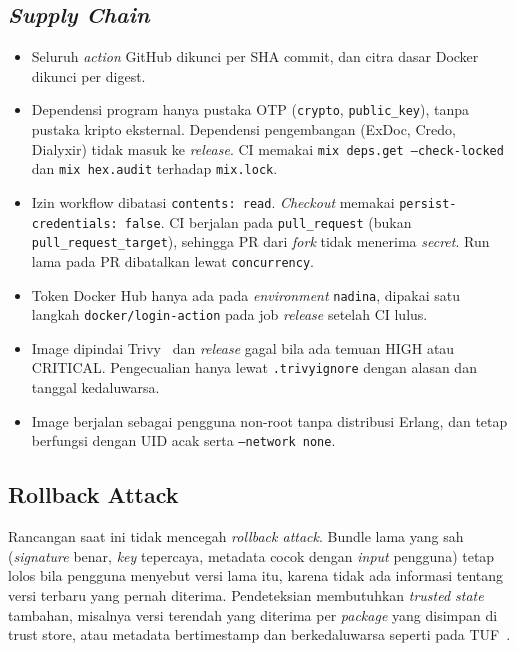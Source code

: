 \subsection{\textit{Supply Chain}}

\begin{itemize}
  \item Seluruh \textit{action} GitHub dikunci per SHA commit, dan citra dasar Docker dikunci per
        digest.
  \item Dependensi program hanya pustaka OTP (\texttt{crypto}, \texttt{public\_key}),
        tanpa pustaka kripto eksternal. Dependensi pengembangan (ExDoc, Credo, Dialyxir)
        tidak masuk ke \textit{release}. CI memakai \texttt{mix deps.get --check-locked}
        dan \texttt{mix hex.audit} terhadap \texttt{mix.lock}.
  \item Izin workflow dibatasi \texttt{contents: read}. \textit{Checkout} memakai
        \texttt{persist-credentials: false}. CI berjalan pada \texttt{pull\_request}
        (bukan \texttt{pull\_request\_target}), sehingga PR dari \textit{fork} tidak
        menerima \textit{secret}. Run lama pada PR dibatalkan lewat \texttt{concurrency}.
  \item Token Docker Hub hanya ada pada \textit{environment} \texttt{nadina}, dipakai satu
        langkah \texttt{docker/login-action} pada job \textit{release} setelah CI lulus.
  \item Image dipindai Trivy~\cite{trivy} dan \textit{release} gagal bila ada temuan HIGH atau CRITICAL.
        Pengecualian hanya lewat \texttt{.trivyignore} dengan alasan dan tanggal kedaluwarsa.
  \item Image berjalan sebagai pengguna non-root tanpa distribusi Erlang, dan tetap
        berfungsi dengan UID acak serta \texttt{--network none}.
\end{itemize}

\subsection{Rollback Attack}
Rancangan saat ini tidak mencegah \textit{rollback attack}. Bundle lama yang sah (\textit{signature} benar, \textit{key} tepercaya, metadata cocok dengan \textit{input} pengguna) tetap lolos bila
pengguna menyebut versi lama itu, karena tidak ada informasi tentang versi terbaru yang
pernah diterima. Pendeteksian membutuhkan \textit{trusted state} tambahan, misalnya
versi terendah yang diterima per \textit{package} yang disimpan di trust store, atau metadata
bertimestamp dan berkedaluwarsa seperti pada TUF~\cite{tuf}.

